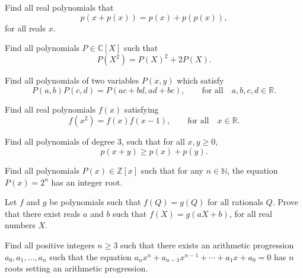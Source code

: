 \begin{question}
Find all real polynomials that \[p(x+p(x))=p(x)+p(p(x)),\] for all reals $x$.
\end{question}



\begin{question}
Find all polynomials $P\in \mathbb C[X]$ such that \[P(X^{2})=P(X)^{2}+2P(X).\]
\end{question}



\begin{question}
Find all polynomials of two variables $P(x,y)$ which satisfy
\[P(a,b) P(c,d) = P (ac+bd, ad+bc), \qquad \text{for all} \quad a,b,c,d \in \mathbb{R}.\]
\end{question}



\begin{question}
Find all real polynomials $f(x)$ satisfying
\[f(x^{2})=f(x)f(x-1), \qquad \text{for all} \quad x \in \mathbb R.\]
\end{question}



\begin{question}
Find all polynomials of degree $3$, such that for all $x,y\geq 0$, \[p(x+y)\geq p(x)+p(y).\]
\end{question}



\begin{question}
Find all polynomials $P(x)\in \mathbb Z[x]$ such that for any $n\in \mathbb N$, the equation $P(x)=2^{n}$ has an integer root.
\end{question}



\begin{question}
Let $f$ and $g$ be polynomials such that $f(Q)=g(Q)$ for all rationals $Q$. Prove that there exist reals $a$ and $b$ such that $f(X)=g(aX+b)$, for all real numbers $X$.
\end{question}



\begin{question}
Find all positive integers $ n\geq 3 $ such that there exists an arithmetic progression $ a_0 , a_1, \ldots, a_n $ such that the equation $ a_nx^n + a_{n-1}x^{n-1} + \cdots+ a_1x+a_0 = 0 $ has $n$ roots setting an arithmetic progression.
\end{question}



